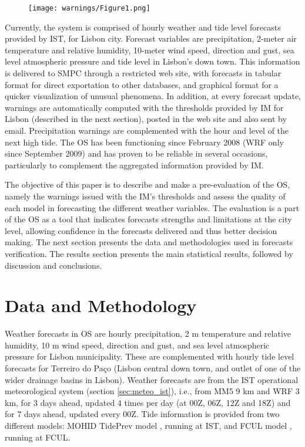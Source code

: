 \begin{figure}[!htp]
    \centering
    \texttt{[image: warnings/Figure1.png]}
\label{fig:OS}
\end{figure}

Currently, the system is comprised of hourly weather and tide level forecasts provided by IST, for Lisbon city. Forecast variables are precipitation, 2-meter air temperature and relative humidity, 10-meter wind speed, direction and gust, sea level atmospheric pressure and tide level in Lisbon's down town. This information is delivered to SMPC through a restricted web site, with forecasts in tabular format for direct exportation to other databases, and graphical format for a quicker visualization of unusual phenomena. In addition, at every forecast update, warnings are automatically computed with the thresholds provided by IM for Lisbon (described in the next section), posted in the web site and also sent by email. Precipitation warnings are complemented with the hour and level of the next high tide. The OS has been functioning since February 2008 (WRF only since September 2009) and has proven to be reliable in several occasions, particularly to complement the aggregated information provided by IM.

The objective of this paper is to describe and make a pre-evaluation of the OS, namely the warnings issued with the IM's thresholds and assess the quality of each model in forecasting the different weather variables. The evaluation is a part of the OS as a tool that indicates forecasts strengths and limitations at the city level, allowing confidence in the forecasts delivered and thus better decision making. The next section presents the data and methodologies used in forecasts verification. The results section presents the main statistical results, followed by discussion and conclusions.



\section{Data and Methodology}

Weather forecasts in OS are hourly precipitation, 2 m temperature and relative humidity, 10 m wind speed, direction and gust, and sea level atmospheric pressure for Lisbon municipality. These are complemented with hourly tide level forecasts for Terreiro do Paço (Lisbon central down town, and outlet of one of the wider drainage basins in Lisbon).  Weather forecasts are from the IST operational meteorological system (section \ref{sec:meteo_ist}), i.e., from MM5 9 km and WRF 3 km, for 3 days ahead, updated 4 times per day (at 00Z, 06Z, 12Z and 18Z) and for 7 days ahead, updated every 00Z. Tide information is provided from two different models: MOHID TidePrev model \citep{Lyard2006}, running at IST, and FCUL model \citep{Antunes2007}, running at FCUL.


